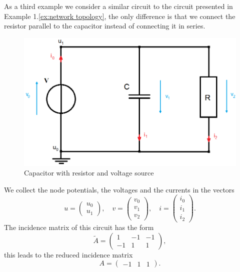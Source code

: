 \begin{example3}
	\label{ex:Example 3 - incidence matrix }
	As a third example we consider a similar circuit to the circuit presented in Example 1.\ref{ex:network topology}, the only difference is that we connect the resistor parallel to the capacitor instead of connecting it in series.
	\begin{figure}[H]
		\label{circuit:Example 3}
		\centering
		\includegraphics[scale=0.5]{pictures/Example3.png}
		\caption{Capacitor with resistor and voltage source}
	\end{figure}
	
	We collect the node potentials, the voltages and the currents in the vectors
	\begin{displaymath}
		u=
		\left(
		\begin{matrix}
			u_0 \\
			u_1 
		\end{matrix}
		\right),
		\quad
		v=
		\left(
		\begin{matrix}
			v_0 \\
			v_1 \\
			v_2 
		\end{matrix}
		\right),
		\quad
		i=
		\left(
		\begin{matrix}
			i_0 \\
			i_1 \\
			i_2 
		\end{matrix}
		\right).
	\end{displaymath}
	The incidence matrix of this circuit has the form
		\begin{displaymath}
		\tilde{A} = 
		\left(
		\begin{matrix}
			1 & -1 & -1 \\
			-1 & 1 & 1 
		\end{matrix}
		\right),
	\end{displaymath}
	this leads to the reduced incidence matrix
	\begin{displaymath}
		A = 
		\left(
		\begin{matrix}
			-1 & 1 & 1
		\end{matrix}
		\right).
	\end{displaymath}
\end{example3}

